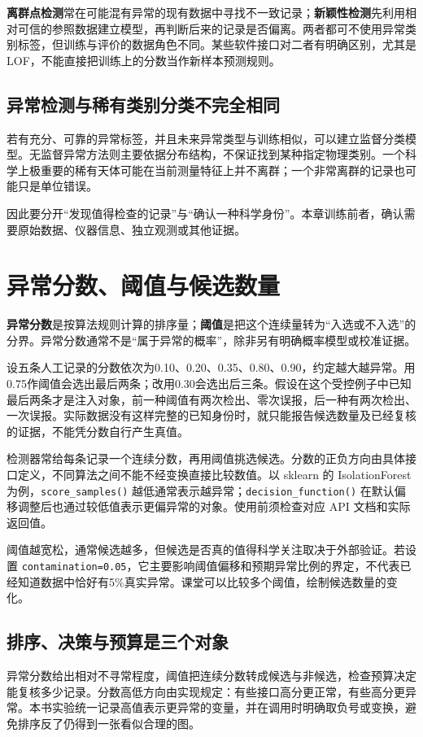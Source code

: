 \textbf{离群点检测}常在可能混有异常的现有数据中寻找不一致记录；\textbf{新颖性检测}先利用相对可信的参照数据建立模型，再判断后来的记录是否偏离。两者都可不使用异常类别标签，但训练与评价的数据角色不同。某些软件接口对二者有明确区别，尤其是LOF，不能直接把训练上的分数当作新样本预测规则。

\subsection{异常检测与稀有类别分类不完全相同}
若有充分、可靠的异常标签，并且未来异常类型与训练相似，可以建立监督分类模型。无监督异常方法则主要依据分布结构，不保证找到某种指定物理类别。一个科学上极重要的稀有天体可能在当前测量特征上并不离群；一个非常离群的记录也可能只是单位错误。

因此要分开“发现值得检查的记录”与“确认一种科学身份”。本章训练前者，确认需要原始数据、仪器信息、独立观测或其他证据。

\section{异常分数、阈值与候选数量}

\textbf{异常分数}是按算法规则计算的排序量；\textbf{阈值}是把这个连续量转为“入选或不入选”的分界。异常分数通常不是“属于异常的概率”，除非另有明确概率模型或校准证据。

设五条人工记录的分数依次为0.10、0.20、0.35、0.80、0.90，约定越大越异常。用0.75作阈值会选出最后两条；改用0.30会选出后三条。假设在这个受控例子中已知最后两条才是注入对象，前一种阈值有两次检出、零次误报，后一种有两次检出、一次误报。实际数据没有这样完整的已知身份时，就只能报告候选数量及已经复核的证据，不能凭分数自行产生真值。

检测器常给每条记录一个连续分数，再用阈值挑选候选。分数的正负方向由具体接口定义，不同算法之间不能不经变换直接比较数值。以 sklearn 的 IsolationForest 为例，\texttt{score\_samples()} 越低通常表示越异常；\texttt{decision\_function()} 在默认偏移调整后也通过较低值表示更偏异常的对象。使用前须检查对应 API 文档和实际返回值。

阈值越宽松，通常候选越多，但候选是否真的值得科学关注取决于外部验证。若设置 \texttt{contamination=0.05}，它主要影响阈值偏移和预期异常比例的界定，不代表已经知道数据中恰好有5\%真实异常。课堂可以比较多个阈值，绘制候选数量的变化。

\subsection{排序、决策与预算是三个对象}
异常分数给出相对不寻常程度，阈值把连续分数转成候选与非候选，检查预算决定能复核多少记录。分数高低方向由实现规定：有些接口高分更正常，有些高分更异常。本书实验统一记录高值表示更异常的变量，并在调用时明确取负号或变换，避免排序反了仍得到一张看似合理的图。

